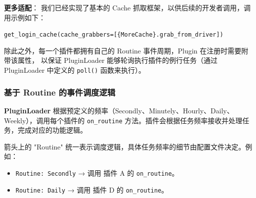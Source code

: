 \documentclass[14pt,a4paper,UTF8,twoside]{article}
\begin{document}
    \begin{rmr}
        \textbf{更多适配}：
        我们已经实现了基本的 Cache 抓取框架，以供后续的开发者调用，调用示例如下：

        \texttt{get\_login\_cache(cache\_grabbers=[\{MoreCache\}.grab\_from\_driver])}
    \end{rmr}

    除此之外，每一个插件都拥有自己的 Routine 事件周期，Plugin 在注册时需要附带该属性，
    以保证 PluginLoader 能够轮询执行插件的例行任务（通过 PluginLoader 中定义的 \texttt{poll()} 函数来执行）。

    \subsubsection{基于 Routine 的事件调度逻辑}

    \begin{note}
        \noindent \textbf{PluginLoader} 根据预定义的频率（Secondly、Minutely、Hourly、Daily、Weekly），调用每个插件的 \texttt{on\_routine} 方法。插件会根据任务频率接收并处理任务，完成对应的功能逻辑。

        \vspace{0.3cm}

        \noindent 箭头上的 "Routine" 统一表示调度逻辑，具体任务频率的细节由配置文件决定。例如：
        \begin{itemize}
            \item \texttt{Routine: Secondly} → 调用 插件 A 的 \texttt{on\_routine}。
            \item \texttt{Routine: Daily} → 调用 插件 D 的 \texttt{on\_routine}。
        \end{itemize}
    \end{note}

    \vspace{0.27cm}
\end{document}
